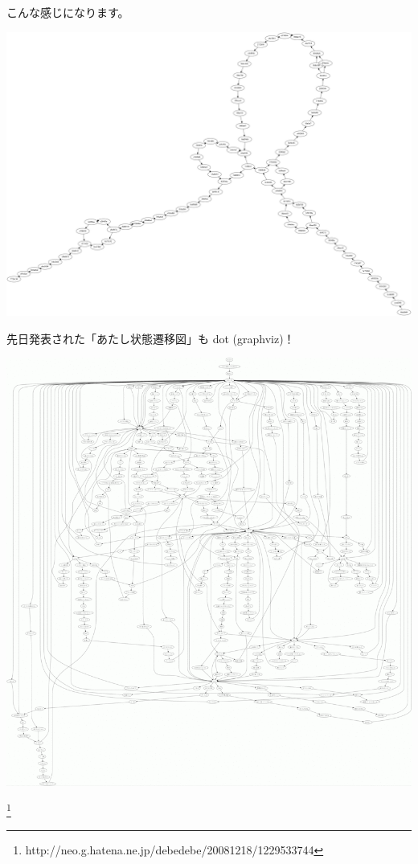 \documentclass[cjk,dvipdfmx,20pt]{beamer}
\begin{document}
\begin{frame}{}
こんな感じになります。
\begin{center}
\includegraphics[width=1.0\hsize]{image200812/git.png}
\end{center}
\end{frame}

\begin{frame}{}
先日発表された「あたし状態遷移図」も dot (graphviz)！
\end{frame}

\begin{frame}{}

\begin{center}
\includegraphics[width=1.0\hsize]{image200812/watashi-graph.png}
\end{center}
\footnote{http://neo.g.hatena.ne.jp/debedebe/20081218/1229533744}
\end{frame}
\end{document}
